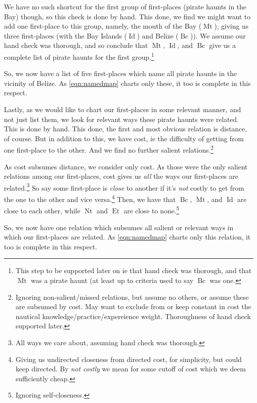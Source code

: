 \documentclass{amsart}
\newcommand{\ment}{\textit} %
\DeclareMathOperator{\id}{Id} %
\DeclareMathOperator{\mt}{Mt} %
\DeclareMathOperator{\bc}{Bc} %
\DeclareMathOperator{\et}{Et} %
\DeclareMathOperator{\nt}{Nt} %
\theoremstyle{definition}
\theoremstyle{remark}
\begin{document}
			We have no such shortcut for the first group of first-places (pirate haunts in the Bay) though, so this check is done by hand. This done, we find we might want to add one first-place to this group, namely, the mouth of the Bay (\(\mt\)), giving us three first-places (with the Bay Islands (\(\id\)) and Belize (\(\bc\))). We assume our hand check was thorough, and so conclude that \(\mt\), \(\id\), and \(\bc\) give us a complete list of pirate haunts for the first group.\footnote{This step to be supported later on ie that hand check was thorough, and that \(\mt\) was a pirate haunt (at least up to criteria used to say \(\bc\) was one.}
		
			So, we now have a list of five first-places which name all pirate haunts in the vicinity of Belize. As \ref{eqn:namedmap} charts only these, it too is complete in this respect.
		
			Lastly, as we would like to chart our first-places in some relevant manner, and not just list them, we look for relevant ways these pirate haunts were related. This is done by hand. This done, the first and most obvious relation is distance, of course. But in addition to this, we have cost, ie the difficulty of getting from one first-place to the other. And we find no further salient relations.\footnote{Ignoring non-salient/missed relations, but assume no others, or assume these are subsumed by cost. May want to exclude from or keep constant in cost the nautical knowledge/practice/expereience weight. Thoroughness of hand check supported later.}
			
			As cost subsumes distance, we consider only cost. As those were the only salient relations among our first-places, cost gives us \emph{all} the ways our first-places are related.\footnote{All ways we care about, assuming hand check was thorough.} So say some first-place is \ment{close} to another if it's \emph{not} costly to get from the one to the other and vice versa.\footnote{Giving us undirected closeness from directed cost, for simplicity, but could keep directed. By \ment{not costly} we mean for some cutoff of cost which we deem sufficiently cheap.} Then, we have that \(\bc\), \(\mt\), and \(\id\) are close to each other, while \(\nt\) and \(\et\) are close to none.\footnote{Ignoring self-closeness.}
			
			So, we now have one relation which subsumes all salient or relevant ways in which our first-places are related. As \ref{eqn:namedmap} charts only this relation, it too is complete in this respect.
			
\end{document}
